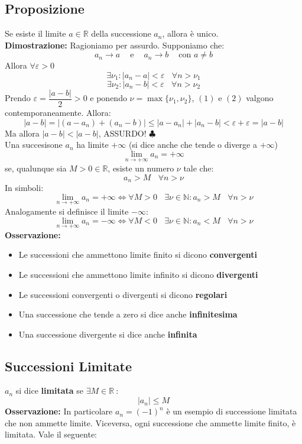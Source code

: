 \documentclass{article}
\newcommand{\R}{\mathbb{R}}
\begin{document}
\subsection{Proposizione}
Se esiste il limite $a\in\R$ della successione $a_n$, allora è unico.\\
\textbf{Dimostrazione:} Ragioniamo per assurdo. Supponiamo che:
\[
    a_n \to a \ \ \ \ \text{ e } \ \ \ \ a_n \to b \ \ \ \ \text{ con } a \neq b
\]
Allora $\forall\varepsilon > 0$
\[
    \exists \nu_1 : |a_n - a| < \varepsilon \ \ \ \ \forall n > \nu_1
\]
\[
    \exists \nu_2 : |a_n - b| < \varepsilon \ \ \ \ \forall n > \nu_2
\]
Prendo $\varepsilon = \dfrac{|a-b|}{2} > 0$ e ponendo $\nu = \max\{\nu_1,
    \nu_2\}$, $(1) \text{ e } (2)$ valgono contemporaneamente. Allora:
\[
    |a-b| = |(a-a_n) + (a_n-b)| \leq |a-a_n| + |a_n-b| < \varepsilon + \varepsilon = |a-b|
\]
Ma allora $|a-b| < |a-b|$, ASSURDO! $\clubsuit$ \\ Una succesisone $a_n$ ha
limite $+\infty$ (si dice anche che tende o diverge a $+\infty$)
\[
    \lim_{n\to+\infty}a_n = +\infty \]
se, qualunque sia $M > 0 \in \R$, esiste un numero $\nu$ tale che:
\[
    a_n > M \ \ \ \ \forall n > \nu
\]
In simboli:
\[
    \lim_{n\to+\infty}a_n = +\infty \iff \forall M > 0 \ \ \ \ \exists \nu \in \mathbb{N} : a_n > M \ \ \ \ \forall n > \nu
\]
Analogamente si definisce il limite $-\infty$:
\[
    \lim_{n\to+\infty}a_n = -\infty \iff \forall M < 0 \ \ \ \ \exists \nu \in \mathbb{N} : a_n < M \ \ \ \ \forall n > \nu
\]
\textbf{Osservazione:} \begin{itemize}
    \item Le successioni che ammettono limite finito si dicono \textbf{convergenti}
    \item Le successioni che ammettono limite infinito si dicono \textbf{divergenti}
    \item Le successioni convergenti o divergenti si dicono \textbf{regolari}
    \item Una successione che tende a zero si dice anche \textbf{infinitesima}
    \item Una successione divergente si dice anche \textbf{infinita}
\end{itemize}

\subsection{Successioni Limitate}
$a_n$ si dice \textbf{limitata} se $\exists M\in\R \ : $
\[
    |a_n| \leq M
\]
\textbf{Osservazione:} In particolare $a_n = (-1)^n$ è un esempio di successione limitata che non ammette limite. Viceversa, ogni successione che ammette limite finito, è limitata. Vale il seguente:
\end{document}

